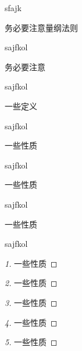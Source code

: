 sfajk

\begin{remark}
	务必要注意量纲法则
\end{remark}

sajfkol

\begin{method}
	务必要注意
\end{method}

sajfkol

\begin{definition}
	一些定义
\end{definition}

sajfkol

\begin{property}
	一些性质
\end{property}

sajfkol

\begin{theorem}
	一些性质
\end{theorem}

sajfkol

\begin{example}
	一些性质
\end{example}

sajfkol

\begin{proof}[1]
	一些性质
\end{proof}

\begin{proof}[2]
	一些性质
\end{proof}

\begin{proof}[3]
	一些性质
\end{proof}

\begin{proof}[4]
	一些性质
\end{proof}

\begin{proof}[5]
	一些性质
\end{proof}

\setlength{\columnseprule}{1pt}

